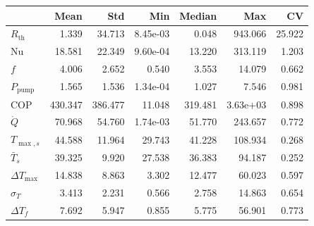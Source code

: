 \begin{tabular}{lrrrrrr}
\toprule
 & Mean & Std & Min & Median & Max & CV \\
\midrule
$R_{\mathrm{th}}$ & 1.339 & 34.713 & 8.45e-03 & 0.048 & 943.066 & 25.922 \\
$\mathrm{Nu}$ & 18.581 & 22.349 & 9.60e-04 & 13.220 & 313.119 & 1.203 \\
$f$ & 4.006 & 2.652 & 0.540 & 3.553 & 14.079 & 0.662 \\
$P_{\mathrm{pump}}$ & 1.565 & 1.536 & 1.34e-04 & 1.027 & 7.546 & 0.981 \\
$\mathrm{COP}$ & 430.347 & 386.477 & 11.048 & 319.481 & 3.63e+03 & 0.898 \\
$\dot{Q}$ & 70.968 & 54.760 & 1.74e-03 & 51.770 & 243.657 & 0.772 \\
$T_{\max,s}$ & 44.588 & 11.964 & 29.743 & 41.228 & 108.934 & 0.268 \\
$\bar{T}_s$ & 39.325 & 9.920 & 27.538 & 36.383 & 94.187 & 0.252 \\
$\Delta T_{\max}$ & 14.838 & 8.863 & 3.302 & 12.477 & 60.023 & 0.597 \\
$\sigma_T$ & 3.413 & 2.231 & 0.566 & 2.758 & 14.863 & 0.654 \\
$\Delta T_f$ & 7.692 & 5.947 & 0.855 & 5.775 & 56.901 & 0.773 \\
\bottomrule
\end{tabular}